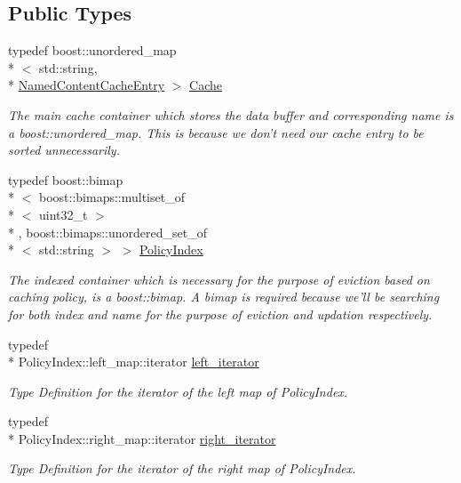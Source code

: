\subsection*{Public Types}
\begin{DoxyCompactItemize}
\item 
typedef boost\-::unordered\-\_\-map\\*
$<$ std\-::string, \\*
\hyperlink{classns3_1_1NamedContentCacheEntry}{Named\-Content\-Cache\-Entry} $>$ \hyperlink{classns3_1_1NamedContentCache_a9aa35d883b9f4153d97b6e7dc74f9307}{Cache}
\begin{DoxyCompactList}\small\item\em The main cache container which stores the data buffer and corresponding name is a boost\-::unordered\-\_\-map. This is because we don't need our cache entry to be sorted unnecessarily. \end{DoxyCompactList}\item 
typedef boost\-::bimap\\*
$<$ boost\-::bimaps\-::multiset\-\_\-of\\*
$<$ uint32\-\_\-t $>$\\*
, boost\-::bimaps\-::unordered\-\_\-set\-\_\-of\\*
$<$ std\-::string $>$ $>$ \hyperlink{classns3_1_1NamedContentCache_a0b728ea2d4e0acbe431897b2374cfc8e}{Policy\-Index}
\begin{DoxyCompactList}\small\item\em The indexed container which is necessary for the purpose of eviction based on caching policy, is a boost\-::bimap. A bimap is required because we'll be searching for both index and name for the purpose of eviction and updation respectively. \end{DoxyCompactList}\item 
typedef \\*
Policy\-Index\-::left\-\_\-map\-::iterator \hyperlink{classns3_1_1NamedContentCache_a0f52ee3d115d1b5fdd1201620b889b6e}{left\-\_\-iterator}
\begin{DoxyCompactList}\small\item\em Type Definition for the iterator of the left map of Policy\-Index. \end{DoxyCompactList}\item 
typedef \\*
Policy\-Index\-::right\-\_\-map\-::iterator \hyperlink{classns3_1_1NamedContentCache_a2c391c6013b29596a2ec5c62d0e413ed}{right\-\_\-iterator}
\begin{DoxyCompactList}\small\item\em Type Definition for the iterator of the right map of Policy\-Index. \end{DoxyCompactList}\item 

\end{DoxyCompactItemize}
